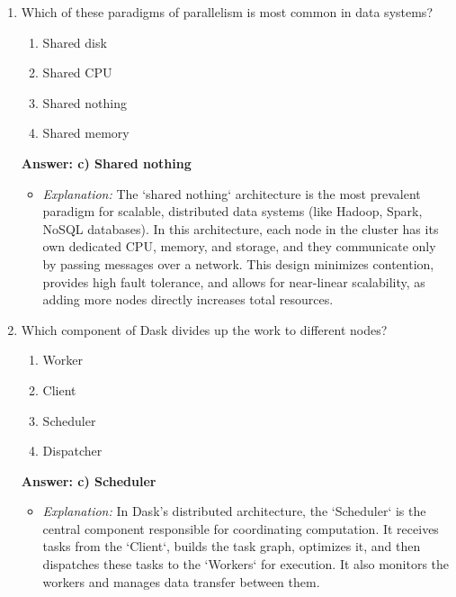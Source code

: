 \documentclass{article}
\begin{document}
\begin{enumerate}[label=\textbf{Question \arabic*.}]
    \item Which of these paradigms of parallelism is most common in data systems?
        \begin{enumerate}[label=\alph*)]
            \item Shared disk
            \item Shared CPU
            \item Shared nothing
            \item Shared memory
        \end{enumerate}
        \textbf{Answer: c) Shared nothing}
        \begin{itemize}
            \item \textit{Explanation:} The `shared nothing` architecture is the most prevalent paradigm for scalable, distributed data systems (like Hadoop, Spark, NoSQL databases). In this architecture, each node in the cluster has its own dedicated CPU, memory, and storage, and they communicate only by passing messages over a network. This design minimizes contention, provides high fault tolerance, and allows for near-linear scalability, as adding more nodes directly increases total resources.
        \end{itemize}
    
    \item Which component of Dask divides up the work to different nodes?
        \begin{enumerate}[label=\alph*)]
            \item Worker
            \item Client
            \item Scheduler
            \item Dispatcher
        \end{enumerate}
        \textbf{Answer: c) Scheduler}
        \begin{itemize}
            \item \textit{Explanation:} In Dask's distributed architecture, the `Scheduler` is the central component responsible for coordinating computation. It receives tasks from the `Client`, builds the task graph, optimizes it, and then dispatches these tasks to the `Workers` for execution. It also monitors the workers and manages data transfer between them.
        \end{itemize}
    

\end{enumerate}
\end{document}
